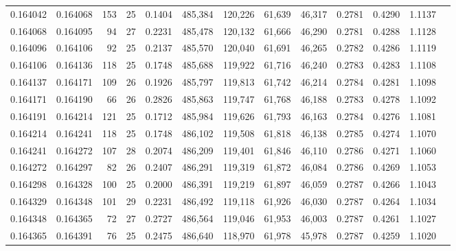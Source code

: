 \begin{tabular}{rrrrrrrrrrrrr}
0.164042 & 0.164068 & 153 &  25 &                                     0.1404 & 485,384 & 120,226 &  61,639 &  46,317 & 0.2781 & 0.4290 & 1.1137 \\
0.164068 & 0.164095 &  94 &  27 &                                     0.2231 & 485,478 & 120,132 &  61,666 &  46,290 & 0.2781 & 0.4288 & 1.1128 \\
0.164096 & 0.164106 &  92 &  25 &                                     0.2137 & 485,570 & 120,040 &  61,691 &  46,265 & 0.2782 & 0.4286 & 1.1119 \\
0.164106 & 0.164136 & 118 &  25 &                                     0.1748 & 485,688 & 119,922 &  61,716 &  46,240 & 0.2783 & 0.4283 & 1.1108 \\
0.164137 & 0.164171 & 109 &  26 &                                     0.1926 & 485,797 & 119,813 &  61,742 &  46,214 & 0.2784 & 0.4281 & 1.1098 \\
0.164171 & 0.164190 &  66 &  26 &                                     0.2826 & 485,863 & 119,747 &  61,768 &  46,188 & 0.2783 & 0.4278 & 1.1092 \\
0.164191 & 0.164214 & 121 &  25 &                                     0.1712 & 485,984 & 119,626 &  61,793 &  46,163 & 0.2784 & 0.4276 & 1.1081 \\
0.164214 & 0.164241 & 118 &  25 &                                     0.1748 & 486,102 & 119,508 &  61,818 &  46,138 & 0.2785 & 0.4274 & 1.1070 \\
0.164241 & 0.164272 & 107 &  28 &                                     0.2074 & 486,209 & 119,401 &  61,846 &  46,110 & 0.2786 & 0.4271 & 1.1060 \\
0.164272 & 0.164297 &  82 &  26 &                                     0.2407 & 486,291 & 119,319 &  61,872 &  46,084 & 0.2786 & 0.4269 & 1.1053 \\
0.164298 & 0.164328 & 100 &  25 &                                     0.2000 & 486,391 & 119,219 &  61,897 &  46,059 & 0.2787 & 0.4266 & 1.1043 \\
0.164329 & 0.164348 & 101 &  29 &                                     0.2231 & 486,492 & 119,118 &  61,926 &  46,030 & 0.2787 & 0.4264 & 1.1034 \\
0.164348 & 0.164365 &  72 &  27 &                                     0.2727 & 486,564 & 119,046 &  61,953 &  46,003 & 0.2787 & 0.4261 & 1.1027 \\
0.164365 & 0.164391 &  76 &  25 &                                     0.2475 & 486,640 & 118,970 &  61,978 &  45,978 & 0.2787 & 0.4259 & 1.1020 \\

\end{tabular}

